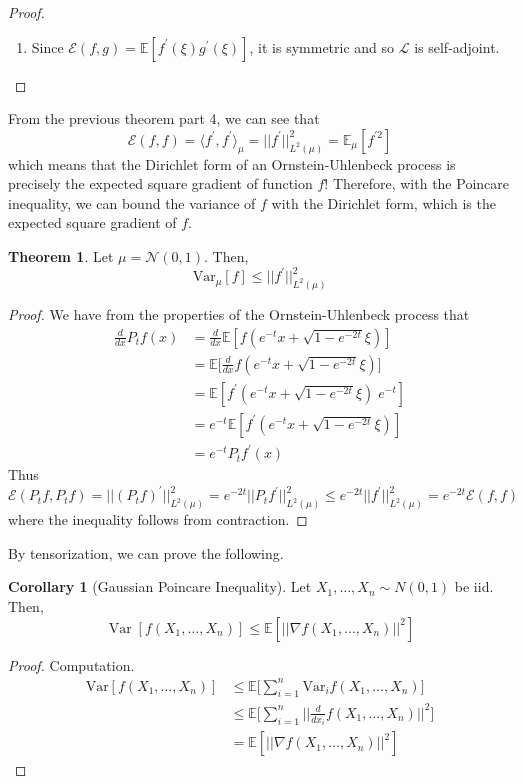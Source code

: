 \documentclass{article}
\DeclareMathOperator{\Var}{Var}
\theoremstyle{definition}
\newtheorem{theorem}{Theorem}[section]
\newtheorem{corollary}{Corollary}[theorem]
\theoremstyle{remark}
\theoremstyle{definition}
\begin{document}
\begin{proof}
\begin{enumerate}
      \item Since $\mathcal{E}(f, g) = \mathbb{E}[f^\prime(\xi) g^\prime (\xi)]$, it is symmetric and so $\mathscr{L}$ is self-adjoint. 
  \end{enumerate}

  \end{proof}

  From the previous theorem part 4, we can see that 
  \[\mathcal{E}(f, f) = \langle f^\prime, f^\prime \rangle_\mu = ||f^\prime||_{L^2(\mu)}^2 = \mathbb{E}_\mu[ f^{\prime 2} ]\]
  which means that the Dirichlet form of an Ornstein-Uhlenbeck process is precisely the expected square gradient of function $f$! Therefore, with the Poincare inequality, we can bound the variance of $f$ with the Dirichlet form, which is the expected square gradient of $f$. 

  \begin{theorem}
  Let $\mu = \mathcal{N}(0, 1)$. Then, 
  \[\mathrm{Var}_\mu [f] \leq ||f^\prime||_{L^2(\mu)}^2\]
  \end{theorem}
  \begin{proof}
  We have from the properties of the Ornstein-Uhlenbeck process that
  \begin{align*}
      \frac{d}{dx} P_t f(x) & = \frac{d}{dx} \mathbb{E}[ f(e^{-t} x + \sqrt{1 - e^{-2t}} \xi)] \\
      & = \mathbb{E} \bigg[ \frac{d}{dx} f(e^{-t} x + \sqrt{1 - e^{-2t}} \xi)] \\
      & = \mathbb{E}[f^\prime (e^{-t} x + \sqrt{1 - e^{-2t}} \xi) \; e^{-t}] \\
      & = e^{-t} \mathbb{E}[f^\prime (e^{-t} x + \sqrt{1 - e^{-2t}} \xi)] \\
      & = e^{-t} P_t f^\prime (x) 
  \end{align*}
  Thus
  \[\mathcal{E}(P_t f, P_t f) = ||(P_t f)^\prime||_{L^2 (\mu)}^2 = e^{-2t} || P_t f^\prime ||^2_{L^2(\mu)} \leq e^{-2t} ||f^\prime||^2_{L^2(\mu)} = e^{-2t} \mathcal{E}(f, f) \]
  where the inequality follows from contraction. 
  \end{proof}

  By tensorization, we can prove the following. 

  \begin{corollary}[Gaussian Poincare Inequality]
  Let $X_1, \ldots, X_n \sim N(0, 1)$ be iid. Then, 
  \[\Var[ f(X_1, \ldots, X_n)] \leq \mathbb{E}[ || \nabla f (X_1, \ldots, X_n)||^2 ]\]
  \end{corollary}
  \begin{proof}
  Computation. 
  \begin{align*}
      \mathrm{Var}[f(X_1, \ldots, X_n)] & \leq \mathbb{E} \bigg[ \sum_{i=1}^n \mathrm{Var}_i f(X_1, \ldots, X_n) \bigg] \\
      & \leq \mathbb{E} \bigg[ \sum_{i=1}^n \bigg| \bigg| \frac{d}{dx_i} f(X_1, \ldots, X_n)\bigg|\bigg|^2 \bigg] \\
      & = \mathbb{E}[ ||\nabla f (X_1, \ldots, X_n) ||^2 ]
  \end{align*}
  \end{proof}
\end{document}
